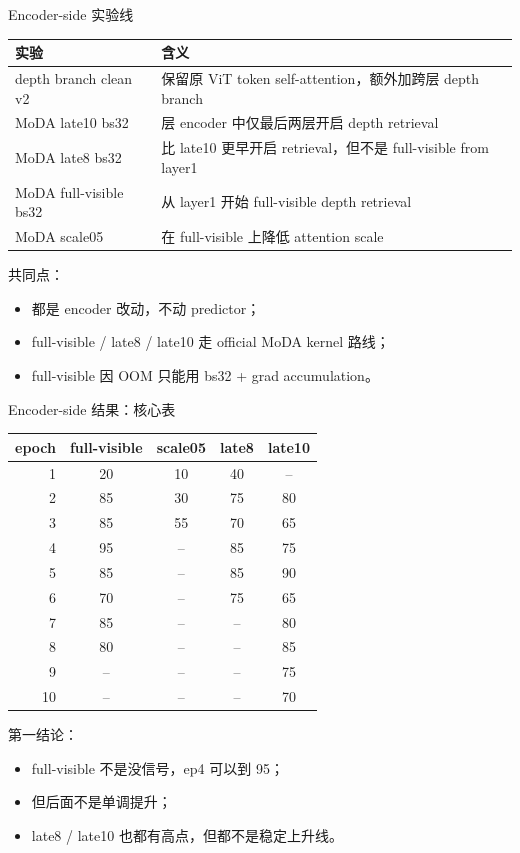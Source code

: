 \documentclass[aspectratio=169,11pt]{beamer}
\begin{document}
\begin{frame}{Encoder-side 实验线}
  \small
  \begin{tabular}{>{\raggedright\arraybackslash}p{3.2cm} >{\raggedright\arraybackslash}p{7.4cm}}
    \toprule
    实验 & 含义 \\
    \midrule
    depth branch clean v2 & 保留原 ViT token self-attention，额外加跨层 depth branch \\
    MoDA late10 bs32 & 12 层 encoder 中仅最后两层开启 depth retrieval \\
    MoDA late8 bs32 & 比 late10 更早开启 retrieval，但不是 full-visible from layer1 \\
    MoDA full-visible bs32 & 从 layer1 开始 full-visible depth retrieval \\
    MoDA scale05 & 在 full-visible 上降低 attention scale \\
    \bottomrule
  \end{tabular}

  \vspace{0.5em}
  共同点：
  \begin{itemize}
    \item 都是 encoder 改动，不动 predictor；
    \item full-visible / late8 / late10 走 official MoDA kernel 路线；
    \item full-visible 因 OOM 只能用 bs32 + grad accumulation。
  \end{itemize}
\end{frame}

\begin{frame}{Encoder-side 结果：核心表}
  \small
  \begin{tabular}{rcccc}
    \toprule
    epoch & full-visible & scale05 & late8 & late10 \\
    \midrule
    1 & 20 & 10 & 40 & -- \\
    2 & 85 & 30 & 75 & 80 \\
    3 & 85 & 55 & 70 & 65 \\
    4 & 95 & -- & 85 & 75 \\
    5 & 85 & -- & 85 & 90 \\
    6 & 70 & -- & 75 & 65 \\
    7 & 85 & -- & -- & 80 \\
    8 & 80 & -- & -- & 85 \\
    9 & -- & -- & -- & 75 \\
    10 & -- & -- & -- & 70 \\
    \bottomrule
  \end{tabular}

  \vspace{0.6em}
  第一结论：
  \begin{itemize}
    \item full-visible 不是没信号，ep4 可以到 95；
    \item 但后面不是单调提升；
    \item late8 / late10 也都有高点，但都不是稳定上升线。
  \end{itemize}
\end{frame}
\end{document}
